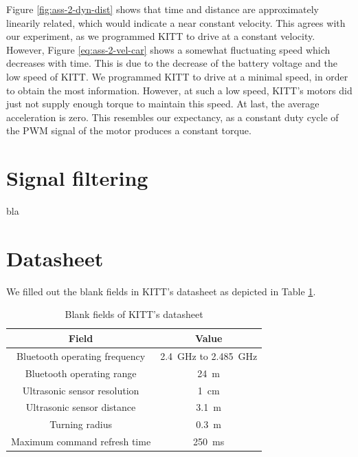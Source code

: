 \documentclass[11pt,titlepage]{report}
\begin{document}
Figure \ref{fig:ass-2-dyn-dist} shows that time and distance are approximately linearily related, which would indicate a near constant velocity. This agrees with our experiment, as we programmed KITT to drive at a constant velocity. However, Figure \ref{eq:ass-2-vel-car} shows a somewhat fluctuating speed which decreases with time. This is due to the decrease of the battery voltage and the low speed of KITT. We programmed KITT to drive at a minimal speed, in order to obtain the most information. However, at such a low speed, KITT's motors did just not supply enough torque to maintain this speed. At last, the average acceleration is zero. This resembles our expectancy, as a constant duty cycle of the PWM signal of the motor produces a constant torque.

\section{Signal filtering}
bla

\section{Datasheet}
We filled out the blank fields in KITT's datasheet as depicted in Table \ref{tab:ass2-datasheet}.

\begin{table}[H]
	\centering
	\caption{Blank fields of KITT's datasheet}
	\label{tab:ass2-datasheet}
	\begin{tabular}{c c}
		\hline\hline
		Field & Value \\
		\hline
		Bluetooth operating frequency & \SI{2.4}{GHz} to \SI{2.485}{GHz} \\
		Bluetooth operating range & \SI{24}{m} \\
		Ultrasonic sensor resolution & \SI{1}{cm} \\
		Ultrasonic sensor distance & \SI{3.1}{m} \\
		Turning radius & \SI{0.3}{m} \\
		Maximum command refresh time & \SI{250}{ms} \\
		\hline
		\end{tabular}
\end{table}
\end{document}
